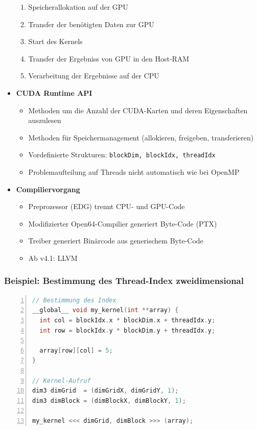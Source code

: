 \begin{itemize}
\begin{enumerate}
		\item Speicherallokation auf der GPU
		\item Transfer der benötigten Daten zur GPU
		\item Start des Kernels
		\item Transfer der Ergebniss von GPU in den Host-RAM
		\item Verarbeitung der Ergebnisse auf der CPU
	\end{enumerate}
	\item \textbf{CUDA Runtime API}
	\begin{itemize}
		\item Methoden um die Anzahl der CUDA-Karten und deren Eigenschaften auszulesen
		\item Methoden für Speichermanagement (allokieren, freigeben, transferieren)
		\item Vordefinierte Strukturen: \texttt{blockDim, blockIdx, threadIdx}
		\item Problemaufteilung auf Threads nicht automatisch wie bei OpenMP
	\end{itemize}
	\item \textbf{Compiliervorgang}
	\begin{itemize}
		\item Preprozessor (EDG) trennt CPU- und GPU-Code
		\item Modifizierter Open64-Compilier generiert Byte-Code (PTX)
		\item Treiber generiert Binärcode aus generischem Byte-Code
		\item Ab v4.1: LLVM
	\end{itemize}
\end{itemize}

\subsubsection{Beispiel: Bestimmung des Thread-Index zweidimensional}
\begin{lstlisting}[frame=single,numbers=left,mathescape,language=C]
// Bestimmung des Index
__global__ void my_kernel(int **array) {
  int col = blockIdx.x * blockDim.x + threadIdx.y;
  int row = blockIdx.y * blockDim.y + threadIdx.y;

  array[row][col] = 5;
}

// Kernel-Aufruf
dim3 dimGrid  = (dimGridX, dimGridY, 1);
dim3 dimBlock = (dimBlockX, dimBlockY, 1);

my_kernel <<< dimGrid, dimBlock >>> (array);
\end{lstlisting}

